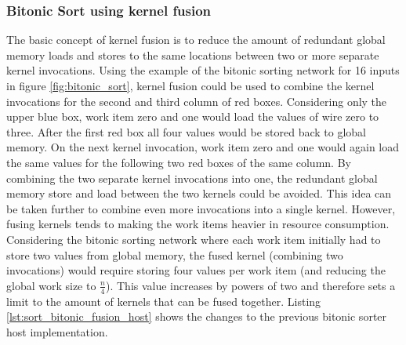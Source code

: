 \subsubsection{Bitonic Sort using kernel fusion}

The basic concept of kernel fusion is to reduce the amount of redundant global memory loads and stores to the same locations between two or more separate kernel invocations.
Using the example of the bitonic sorting network for 16 inputs in figure \ref{fig:bitonic_sort}, kernel fusion could be used to combine the kernel invocations for the second and third column of red boxes. Considering only the upper blue box, work item zero and one would load the values of wire zero to three. After the first red box all four values would be stored back to global memory. On the next kernel invocation, work item zero and one would again load the same values for the following two red boxes of the same column. By combining the two separate kernel invocations into one, the redundant global memory store and load between the two kernels could be avoided.
This idea can be taken further to combine even more invocations into a single kernel. However, fusing kernels tends to making the work items heavier in resource consumption. Considering the bitonic sorting network where each work item initially had to store two values from global memory, the fused kernel (combining two invocations) would require storing four values per work item (and reducing the global work size to $\frac{n}{4}$). This value increases by powers of two and therefore sets a limit to the amount of kernels that can be fused together.
Listing \ref{lst:sort_bitonic_fusion_host} shows the changes to the previous bitonic sorter host implementation.



